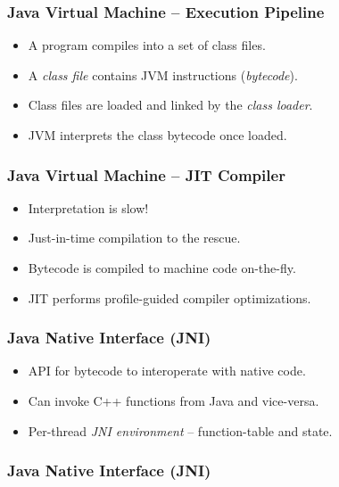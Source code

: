 \documentclass{beamer}
\begin{document}
\begin{frame}
\frametitle{Java Virtual Machine -- Execution Pipeline}
\begin{itemize}
\item A program compiles into a set of class files.
\item A \emph{class file} contains JVM instructions (\emph{bytecode}).
\item Class files are loaded and linked by the \emph{class loader}.
\item JVM interprets the class bytecode once loaded.
\end{itemize}
\end{frame}

\begin{frame}
\frametitle{Java Virtual Machine -- JIT Compiler}
\begin{itemize}
\item Interpretation is slow!
\item Just-in-time compilation to the rescue.
\item Bytecode is compiled to machine code on-the-fly.
\item JIT performs profile-guided compiler optimizations.
\end{itemize}
\end{frame}

\begin{frame}
\frametitle{Java Native Interface (JNI)}
\begin{itemize}
\item API for bytecode to interoperate with native code.
\item Can invoke C++ functions from Java and vice-versa.
\item Per-thread \emph{JNI environment} -- function-table and state.
\end{itemize}
\end{frame}

\begin{frame}
\frametitle{Java Native Interface (JNI)}
\begin{figure}[b]
\par\noindent\begin{minipage}[t]{.45\textwidth}

\end{minipage}\hfill
\begin{minipage}[t]{.52\textwidth}

\end{minipage}
\end{figure}
\end{frame}
\end{document}
